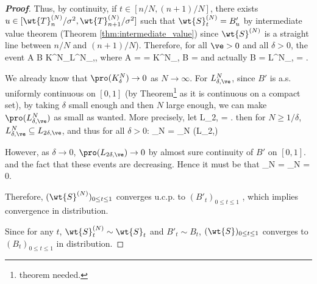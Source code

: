 \begin{proof}[\bf Proof]
Thus, by continuity, if $t\in [n/N, (n + 1)/N]$, there exists $u \in [\wt{T}^{(N)}_n/\sigma^2, \wt{T}^{(N)}_{n+1}/\sigma^2]$ such that $\wt{S}^{(N)}_t = B'_u$ by intermediate value theorem (Theorem \ref{thm:intermediate_value}) since $\wt{S}^{(N)}$ is a straight line between $n/N$ and $(n+1)/N$). Therefore, for all $\ve > 0$ and all $\delta > 0$, the event
\be
{} \subseteq A \cup B \subseteq  K^N_\delta \cup L^N_{\delta,\ve},
\ee
where
\be
A =  \subseteq  {} = K^N_\delta,
\ee
\be
B = 
\ee
and actually
\be
B = L^N_{\delta,\ve} = .
\ee


We already know that $\pro(K^N_\delta) \to 0$ as $N\to\infty$. For $L^N_{\delta,\ve}$, since $B'$ is a.s. uniformly continuous on $[0, 1]$ (by Theorem\footnote{theorem needed.} as it is continuous on a compact set), by taking $\delta$ small enough and then $N$ large enough, we can make $\pro(L^N_{\delta,\ve})$ as small as wanted. More precisely, let
\be
L_{2\delta,\ve} = .
\ee
then for $N \geq 1/\delta$, $L^N_{\delta,\ve} \subseteq  L_{2\delta,\ve}$, and thus for all $\delta > 0$:
\be
\limsup_{N\to\infty} \pro{} = \limsup_{N\to\infty} \pro{} \leq \pro(L_{2\delta,\ve})
\ee

However, as $\delta\to 0$, $\pro(L_{2\delta,\ve}) \to 0$ by almost sure continuity of $B'$ on $[0, 1]$. and the fact that these events are decreasing.
Hence it must be that
\be
\limsup_{N\to\infty} \pro{} = \limsup_{N\to\infty} \pro{} = 0.
\ee

Therefore, $(\wt{S}^{(N)})_{0 \leq t \leq 1}$ converges u.c.p. %
to $(B'_t)_{0 \leq t \leq 1}$ , which implies convergence in distribution. %

Since for any $t$, $\wt{S}^{(N)}_t \sim \wt{S}_t$ and $B'_t\sim B_t$, $(\wt{S})_{0 \leq t \leq 1}$ converges to $(B_t)_{0 \leq t \leq 1}$ in distribution.
\end{proof}

